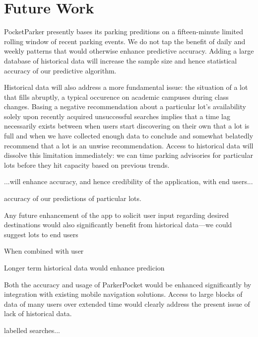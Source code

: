 \section{Future Work}
\label{sec-future}



PocketParker presently bases its parking preditions on a fifteen-minute 
limited rolling window of recent parking events. We do not tap the benefit
of daily and weekly patterns that would otherwise enhance predictive accuracy.
Adding a large database of historical data will increase the sample size and
hence statistical accuracy of our predictive algorithm.

Historical data will also address a more fundamental issue:  the situation
of a lot that fills abruptly, a typical occurence on academic campuses during
class changes. Basing a negative recommendation about a particular lot's
availability solely upon recently acquired unsuccessful searches implies that
a time lag necessarily exists between when users start discovering on their
own that a lot is full and when we have collected enough data to conclude and
somewhat belatedly recommend that a lot is an unwise recommendation. Access
to historical data will dissolve this limitation immediately:  we can time
parking advisories for particular lots before they hit capacity based on
previous trends.


...will enhance accuracy, and hence credibility of the application, with end users...

accuracy of our predictions of particular lots.

Any future enhancement of the app to solicit user input regarding desired
destinations would also significantly benefit from historical data---we
could suggest lots to end users 

When combined with user

Longer term historical data
would enhance predicion




Both the accuracy and usage of ParkerPocket would be enhanced significantly
by integration with existing mobile navigation solutions.  Access to large blocks of data of many users over extended time
would clearly address the present issue of lack of historical data.


labelled searches...







